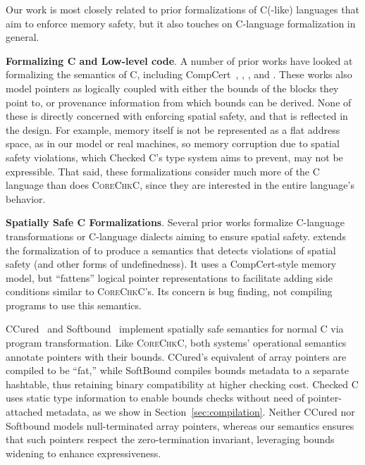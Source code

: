 \documentclass[conference]{IEEEtran}
\newcommand{\myparagraph}[1]{\textbf{#1}.\xspace}
\newcommand{\lang}{\textsc{CoreChkC}\xspace}
\begin{document}
Our work is most closely related to prior formalizations of C(-like)
languages that aim to enforce memory safety, but it also touches on
C-language formalization in general.


\myparagraph{Formalizing C and Low-level code}
A number of prior works have looked at formalizing the semantics of C,
including CompCert~\cite{Blazy2009,leroy:hal-00703441},
\citet{ellison-rosu-2012-popl}, \citet{Kang:2015:FCM:2813885.2738005},
and \citet{10.1145/2980983.2908081, Memarian:2019:ECS:3302515.3290380}. These works also model
pointers as logically coupled with either the bounds of the blocks
they point to, or provenance information from which bounds can be
derived. None of these is directly concerned with enforcing
spatial safety, and that is reflected in the design. For example,
memory itself is not be represented as a flat address space, as in our
model or real machines, so memory corruption due to spatial safety
violations, which Checked C's type system aims to prevent, may not be
expressible. That said, these formalizations consider much more of the
C language than does \lang, since they are interested in the entire
language's behavior.

\myparagraph{Spatially Safe C Formalizations}
Several prior works formalize C-language transformations or C-language
dialects aiming to ensure spatial safety. 
\citet{10.1145/2813885.2737979} extends the formalization
of \citet{ellison-rosu-2012-popl} to produce a semantics that detects
violations of spatial safety (and other forms of undefinedness). It
uses a CompCert-style memory model, but ``fattens'' logical pointer
representations to facilitate adding side conditions similar to \lang's.
Its concern is bug finding, not compiling programs to
use this semantics.

CCured~\cite{Necula2005} and Softbound~\cite{softbound} implement
spatially safe semantics for normal C via program transformation. Like
\lang, both systems' operational semantics annotate pointers with
their bounds. CCured's equivalent of array pointers are compiled to be
``fat,'' while SoftBound compiles bounds metadata to a separate
hashtable, thus retaining binary compatibility at higher checking
cost. Checked C uses static type information to enable bounds checks
without need of pointer-attached metadata, as we show in
Section~\ref{sec:compilation}. Neither CCured nor Softbound models
null-terminated array pointers, whereas our semantics ensures that
such pointers respect the zero-termination invariant, leveraging
bounds widening to enhance expressiveness.
\end{document}
